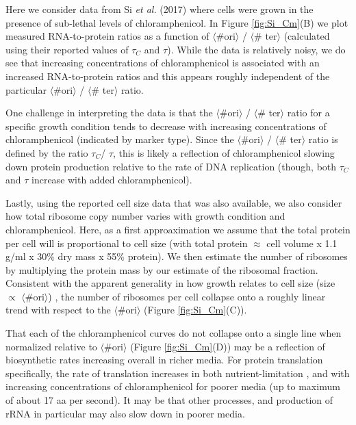 Here we consider data from Si \textit{et al.} (2017) where cells were grown in
the presence of sub-lethal levels of chloramphenicol. In Figure \ref{fig:Si_Cm}(B) we
plot measured RNA-to-protein ratios as a function of $\langle$\#ori$\rangle$ /
$\langle$\# ter$\rangle$ (calculated using their reported values of $\tau_C$ and
$\tau$). While the data is relatively noisy, we do see that
increasing concentrations of chloramphenicol is associated with an increased
RNA-to-protein ratios and this appears roughly independent of the particular
$\langle$\#ori$\rangle$ / $\langle$\# ter$\rangle$ ratio.

One challenge in interpreting the data is that the $\langle$\#ori$\rangle$ /
$\langle$\# ter$\rangle$ ratio for a specific growth condition tends to decrease
with increasing concentrations of chloramphenicol (indicated by marker type).
Since the $\langle$\#ori$\rangle$ / $\langle$\# ter$\rangle$ ratio is defined by
the ratio $\tau_C$/ $\tau$, this is likely a reflection of chloramphenicol
slowing down protein production relative to the rate of DNA replication (though,
both $\tau_C$ and $\tau$ increase with added chloramphenicol).

Lastly, using the reported cell size data that was also available, we also
consider how total ribosome copy number varies with growth condition and
chloramphenicol. Here, as a first approaximation we assume that the total
protein per cell will is proportional to cell size (with total protein $\approx$
cell volume x 1.1 g/ml x 30\% dry mass x 55\% protein). We then estimate the
number of ribosomes by multiplying the protein mass by our estimate of the
ribosomal fraction.  Consistent with the apparent generality in how growth
relates to cell size (size $\propto$ $\langle$\#ori$\rangle$) \citep{si2017},
the number of ribosomes per cell collapse  onto a roughly linear trend with
respect to the  $\langle$\#ori$\rangle$ (Figure \ref{fig:Si_Cm}(C)).

That each of the chloramphenicol curves do not collapse onto a single line when
normalized relative to $\langle$\#ori$\rangle$ (Figure \ref{fig:Si_Cm}(D))
may be a reflection of biosynthetic rates increasing overall in richer media.
For protein translation specifically, the rate of translation increases in both
nutrient-limitation \citep{scott2010}, and with increasing concentrations of
chloramphenicol \citep{dai2016} for poorer media (up to maximum of about 17 aa
per second). It may be that other processes, and production of rRNA in
particular may also slow down in poorer media.

